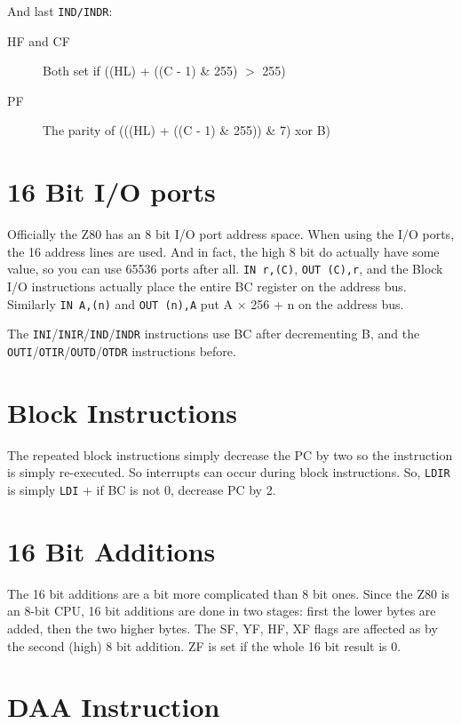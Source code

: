 \documentclass[oneside,a4paper]{book}
\begin{document}
And last {\tt IND/INDR}:

\begin{description}

	\item[HF and CF]
	Both set if ((HL) + ((C - 1) \& 255) $>$ 255)

	\item[PF]
	The parity of (((HL) + ((C - 1) \& 255)) \& 7) xor B)

\end{description}


\section{16 Bit I/O ports}

Officially the Z80 has an 8 bit I/O port address space. When using the I/O ports, the 16 address lines are used. And in fact, the high 8 bit do actually have some value, so you can use 65536 ports after all. {\tt IN r,(C)}, {\tt OUT (C),r}, and the Block I/O instructions  actually place the entire BC register on the address bus. Similarly {\tt IN A,(n)} and {\tt OUT (n),A} put A $\times$ 256 + n on the address bus.

The {\tt INI}/{\tt INIR}/{\tt IND}/{\tt INDR} instructions use BC after decrementing B, and the {\tt OUTI}/{\tt OTIR}/{\tt OUTD}/{\tt OTDR} instructions before.


\section{Block Instructions}

The repeated block instructions simply decrease the PC by two so the instruction is simply re-executed. So interrupts can occur during block instructions. So, {\tt LDIR} is simply {\tt LDI} + if BC is not 0, decrease PC by 2.


\section{16 Bit Additions}

The 16 bit additions are a bit more complicated than 8 bit ones. Since the Z80 is an 8-bit CPU, 16 bit additions are done in two stages: first the lower bytes are added, then the two higher bytes. The SF, YF, HF, XF flags are affected as by the second (high) 8 bit addition. ZF is set if the whole 16 bit result is 0.


\section{DAA Instruction}
\label{daa}
\end{document}
